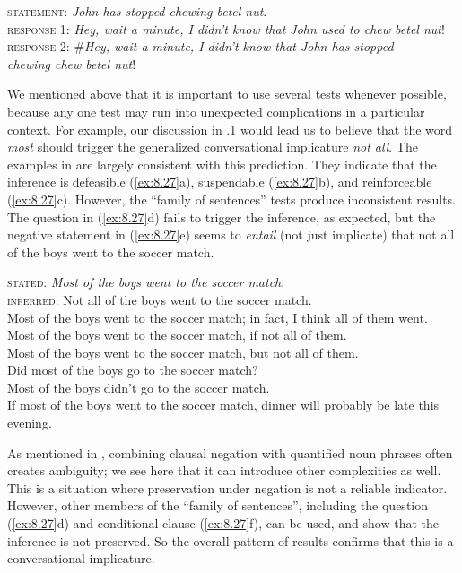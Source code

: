 \begin{stylepoints} \label{ex:8.26}
\textsc{statement}: \textit{John has stopped chewing betel nut}.\\
\ea \textsc{response 1}: \textit{Hey, wait a minute, I didn’t know that John used to chew betel nut}!\\
\ex \textsc{response 2}: \#\textit{Hey, wait a minute, I didn’t know that John has stopped\\
  chewing chew betel nut}!
                       \z
\end{stylepoints}


We mentioned above that it is important to use several tests whenever possible, because any one test may run into unexpected complications in a particular context. For example, our discussion in .1 would lead us to believe that the word \textit{most} should trigger the generalized conversational implicature \textit{not all}. The examples in  are largely consistent with this prediction. They indicate that the inference is defeasible (\ref{ex:8.27}a), suspendable (\ref{ex:8.27}b), and reinforceable (\ref{ex:8.27}c). However, the “family of sentences” tests produce inconsistent results. The question in (\ref{ex:8.27}d) fails to trigger the inference, as expected, but the negative statement in (\ref{ex:8.27}e) seems to \textit{entail} (not just implicate) that not all of the boys went to the soccer match.


\begin{stylepoints} \label{ex:8.27}
\textsc{stated}: \textit{Most of the boys went to the soccer match}.\\
\textsc{inferred}: Not all of the boys went to the soccer match.\\
\ea Most of the boys went to the soccer match; in fact, I think all of them went.\\
\ex Most of the boys went to the soccer match, if not all of them.\\
\ex Most of the boys went to the soccer match, but not all of them.\\
\ex Did most of the boys go to the soccer match?\\
\ex Most of the boys didn’t go to the soccer match.\\
\ex If most of the boys went to the soccer match, dinner will probably be late this evening.
                       \z
\end{stylepoints}


As mentioned in , combining clausal negation with quantified noun phrases often creates ambiguity; we see here that it can introduce other complexities as well. This is a situation where preservation under negation is not a reliable indicator. However, other members of the “family of sentences”, including the question (\ref{ex:8.27}d) and conditional clause (\ref{ex:8.27}f), can be used, and show that the inference is not preserved. So the overall pattern of results confirms that this is a conversational implicature.



